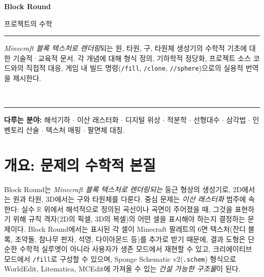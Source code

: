 \documentclass[12pt,a4paper]{scrartcl}
\newcommand{\code}[1]{\texttt{\small #1}}
\newcommand{\cmd}[1]{\textcolor{earth}{\texttt{\small #1}}}
\begin{document}
\begin{titlepage}
  \centering
  \vspace*{3.5cm}
  {\sffamily\bfseries\fontsize{56}{60}\selectfont \color{accent} Block Round\par}
  \vspace{0.7cm}
  {\sffamily\LARGE\color{muted} 프로젝트의 수학\par}
  \vspace{1.4cm}
  {\color{rule}\rule{0.6\textwidth}{0.6pt}\par}
  \vspace{0.9cm}
  \begin{minipage}{0.82\textwidth}
    \centering\color{ink}\large
    \emph{Minecraft 블록 텍스처로 렌더링}되는 원, 타원, 구, 타원체 생성기의 수학적 기초에 대한 기술적·교육적 문서. 각 개념에 대해 형식 정의, 기하학적 정당화, 프로젝트 소스 코드와의 직접적 대응, 게임 내 빌드 명령(\cmd{/fill}, \cmd{/clone}, \cmd{//sphere})으로의 실용적 번역을 제시한다.
  \end{minipage}
  \vspace{0.9cm}\\
  {\color{rule}\rule{0.6\textwidth}{0.6pt}\par}
  \vspace{2cm}
  \begin{minipage}{0.78\textwidth}
    \centering\sffamily\small\color{muted}
    \textbf{다루는 분야:} 해석기하 $\cdot$ 이산 래스터화 $\cdot$ 디지털 위상 $\cdot$ 적분학 $\cdot$ 선형대수 $\cdot$ 삼각법 $\cdot$ 인벤토리 산술 $\cdot$ 텍스처 매핑 $\cdot$ 팔면체 대칭.
  \end{minipage}
\end{titlepage}

\renewcommand{\contentsname}{\color{accent}목차}
\tableofcontents
\thispagestyle{fancy}
\newpage

\section{개요: 문제의 수학적 본질}

Block Round는 \emph{Minecraft 블록 텍스처로 렌더링되는} 둥근 형상의 생성기로, 2D에서는 원과 타원, 3D에서는 구와 타원체를 다룬다. 중심 문제는 \emph{이산 래스터화} 범주에 속한다: 실수 $\mathbb{R}$ 위에서 해석적으로 정의된 곡선이나 곡면이 주어졌을 때, 그것을 표현하기 위해 규칙 격자(2D의 픽셀, 3D의 복셀)의 어떤 셀을 표시해야 하는지 결정하는 문제이다. Block Round에서는 표시된 각 셀이 Minecraft 팔레트의 6면 텍스처(잔디 블록, 조약돌, 참나무 판자, 석영, 다이아몬드 등)를 추가로 받기 때문에, 결과 도형은 단순한 수학적 실루엣이 아니라 사용자가 생존 모드에서 재현할 수 있고, 크리에이티브 모드에서 \cmd{/fill}로 구성할 수 있으며, Sponge Schematic v2(\code{.schem}) 형식으로 WorldEdit, Litematica, MCEdit에 가져올 수 있는 \emph{건설 가능한 구조물}이 된다.
\end{document}

